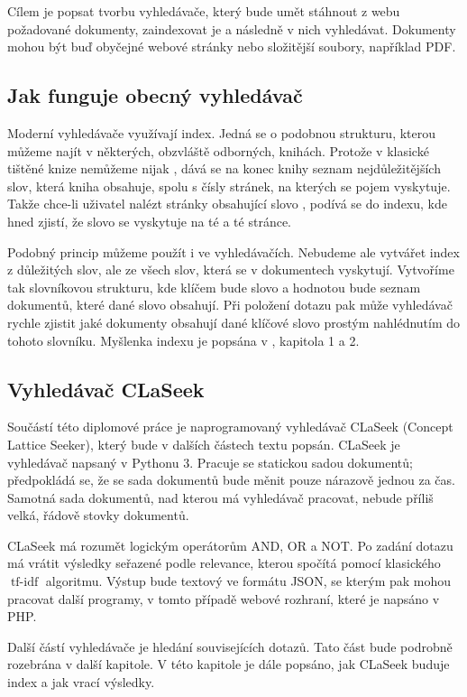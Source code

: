 \documentclass{article}
\newcommand{\name}{CLaSeek}
\DeclareMathOperator{\tfidf}{tf-idf}
\begin{document}
Cílem je popsat tvorbu vyhledávače, který bude umět stáhnout z webu požadované dokumenty, zaindexovat je a následně v nich vyhledávat. Dokumenty mohou být buď obyčejné webové stránky nebo složitější soubory, například PDF. 

\subsection{Jak funguje obecný vyhledávač}
Moderní vyhledávače využívají index. Jedná se o podobnou strukturu, kterou můžeme najít v některých, obzvláště odborných, knihách. Protože v klasické tištěné knize nemůžeme nijak , dává se na konec knihy seznam nejdůležitějších slov, která kniha obsahuje, spolu s čísly stránek, na kterých se pojem vyskytuje. Takže chce-li uživatel nalézt stránky obsahující slovo , podívá se do indexu, kde hned zjistí, že slovo se vyskytuje na té a té stránce. 

Podobný princip můžeme použít i ve vyhledávačích. Nebudeme ale vytvářet index z důležitých slov, ale ze všech slov, která se v dokumentech vyskytují. Vytvoříme tak slovníkovou strukturu, kde klíčem bude slovo a hodnotou bude seznam dokumentů, které dané slovo obsahují. Při položení dotazu pak může vyhledávač rychle zjistit jaké dokumenty obsahují dané klíčové slovo prostým nahlédnutím do tohoto slovníku. Myšlenka indexu je popsána v \cite{introir}, kapitola 1 a 2.

\subsection{Vyhledávač \name}

Součástí této diplomové práce je naprogramovaný vyhledávač \name{} (Concept Lattice Seeker), který bude v dalších částech textu popsán. \name{} je vyhledávač napsaný v Pythonu 3. Pracuje se statickou sadou dokumentů; předpokládá se, že se sada dokumentů bude měnit pouze nárazově jednou za čas. Samotná sada dokumentů, nad kterou má vyhledávač pracovat, nebude příliš velká, řádově stovky dokumentů. 

\name{} má rozumět logickým operátorům AND, OR a NOT. Po zadání dotazu má vrátit výsledky seřazené podle relevance, kterou spočítá pomocí klasického $\tfidf$ algoritmu. Výstup bude textový ve formátu JSON, se kterým pak mohou pracovat další programy, v tomto případě webové rozhraní, které je napsáno v PHP. 

Další částí vyhledávače je hledání souvisejících dotazů. Tato část bude podrobně rozebrána v další kapitole. V této kapitole je dále popsáno, jak \name{} buduje index a jak vrací výsledky. 
\end{document}
